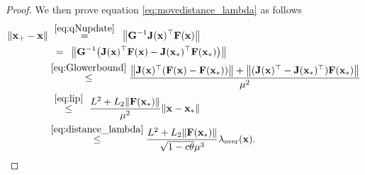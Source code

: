 \documentclass[11pt]{article}
\theoremstyle{plain}
\theoremstyle{definition}
\theoremstyle{remark}
\theoremstyle{plain}
\newcommand{\Norm}[1]{\left\| #1 \right\|}
\def\F{{\bf F}}
\def\G{{\bf G}}
\def \J{{\bf J}}
\def\x{{\bf x}}
\begin{document}
\begin{proof}
We then prove equation \eqref{eq:movedistance_lambda} as follows
\begin{align}\label{eq:x_+-xlambda}
\begin{split}    
\|\x_{+}-\x\|
&\,\,\overset{\eqref{eq:qNupdate}}{=}~\, 
\Norm{\G^{-1}\J(\x)^{\top}\F(\x)} \\
&\,~=\,~\Norm{\G^{-1}\bigl(\J(\x)^{\top}\F(\x)
-\J(\x_*)^{\top}\F(\x_*)\bigr)} \\
& \overset{\eqref{eq:Glowerbound}}\leq\frac{\Norm{\J(\x)^{\top}(\F(\x)-\F(\x_*))}
 +\Norm{(\J(\x)^{\top}-\J(\x_*)^{\top})\F(\x_*)}}{\mu^2} \\
&\,\,\overset{\eqref{eq:lip}}{\leq}\,\,
\frac{L^2+L_2\|\F(\x_*)\|}{\mu^2}\|\x-\x_*\| \\
&\overset{\eqref{eq:distance_lambda}}{\leq}
\frac{L^2+L_2\|\F(\x_*)\|}{\sqrt{1-c\theta}\mu^3}
\lambda_{\mathrm{over}}(\x).
\end{split}
\end{align}


\end{proof}
\end{document}
